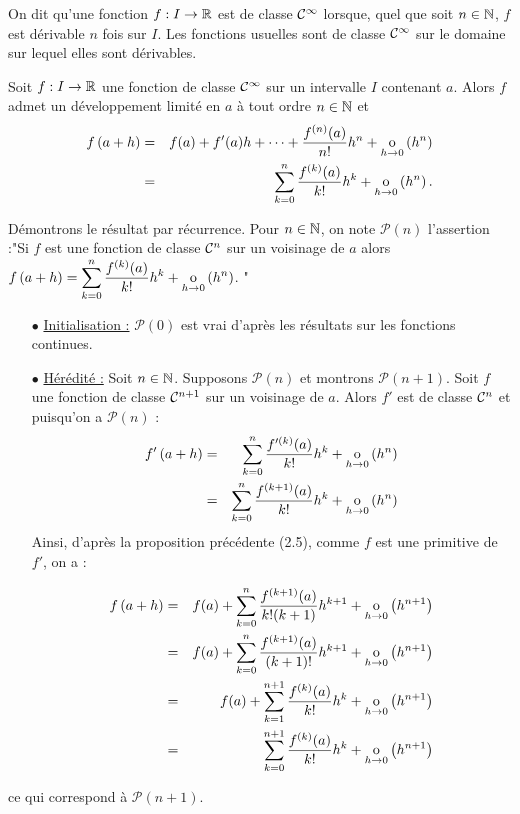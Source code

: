 \documentclass{magnoliaold}
\begin{document}
On dit qu'une fonction $f:I\to\mathbb{R}$ est de classe $\mathcal{C}^{\infty}$ lorsque, quel que
soit $n\in\mathbb{N}$, $f$ est dérivable $n$ fois sur $I$. Les fonctions usuelles sont
de classe $\mathcal{C}^{\infty}$ sur le domaine sur lequel elles sont dérivables.

\begin{proposition}[utile=-3,nom={Formule de \nom{Taylor-Young}}]
Soit $f:I\to\mathbb{R}$ une fonction de classe $\mathcal{C}^{\infty}$ sur un intervalle $I$ contenant
$a$. Alors $f$ admet un développement limité en $a$ à tout ordre $n\in\mathbb{N}$
et
\begin{eqnarray*}
f\left(a+h\right) &=& f(a)+f'(a)h+\cdots+\frac{f^{(n)}(a)}{n!}h^n+
  \underset{h \rightarrow 0}{\text{o}}\left(h^n\right)\\
  &=& \sum_{k=0}^n \frac{f^{(k)}(a)}{k!}h^k + \underset{h \rightarrow 0}{\text{o}}\left(h^n\right).
\end{eqnarray*}
\end{proposition}

\begin{preuve}
Démontrons le résultat par récurrence. Pour $n\in \mathbb{N}$, on note $\mathcal{P}(n)$ l'assertion :"Si $f$ est une fonction de classe $\mathcal{C}^{n}$ sur un voisinage de 
$a$ alors $f\left(a+h\right)=\displaystyle\sum_{k=0}^n \frac{f^{(k)}(a)}{k!}h^k + \underset{h \rightarrow 0}{\text{o}}\left(h^n\right)$. "

\begin{itemize}
\item[$\bullet$]\underline{Initialisation :} $\mathcal{P}(0)$ est vrai d'après les résultats sur les fonctions continues.
\item[$\bullet$]\underline{Hérédité :} Soit $n\in\mathbb{N}$. Supposons $\mathcal{P}(n)$ et montrons $\mathcal{P}(n+1)$. Soit $f$ une fonction de classe $\mathcal{C}^{n+1}$ sur un voisinage de $a$. Alors $f'$ est de classe $\mathcal{C}^{n}$ et puisqu'on a $\mathcal{P}(n)$ :
\begin{eqnarray*}
f'\left(a+h\right)&=&\displaystyle\sum_{k=0}^n \frac{f'^{(k)}(a)}{k!}h^k + \underset{h \rightarrow 0}{\text{o}}\left(h^n\right)\\
&=&\displaystyle\sum_{k=0}^n \frac{f^{(k+1)}(a)}{k!}h^k + \underset{h \rightarrow 0}{\text{o}}\left(h^n\right)
\end{eqnarray*}
Ainsi, d'après la proposition précédente (2.5), comme $f$ est une primitive de $f'$, on a : 

\begin{eqnarray*}
f\left(a+h\right)&=&f(a)+\displaystyle\sum_{k=0}^n \frac{f^{(k+1)}(a)}{k!(k+1)}h^{k+1} + \underset{h \rightarrow 0}{\text{o}}\left(h^{n+1}\right)\\
&=&f(a)+\displaystyle\sum_{k=0}^n \frac{f^{(k+1)}(a)}{(k+1)!}h^{k+1} + \underset{h \rightarrow 0}{\text{o}}\left(h^{n+1}\right)\\
&=&f(a)+\displaystyle\sum_{k=1}^{n+1} \frac{f^{(k)}(a)}{k!}h^{k} + \underset{h \rightarrow 0}{\text{o}}\left(h^{n+1}\right)\\
&=&\displaystyle\sum_{k=0}^{n+1} \frac{f^{(k)}(a)}{k!}h^{k} + \underset{h \rightarrow 0}{\text{o}}\left(h^{n+1}\right)
\end{eqnarray*}
\end{itemize}
ce qui correspond à $\mathcal{P}(n+1)$.
\end{preuve}
\end{document}
